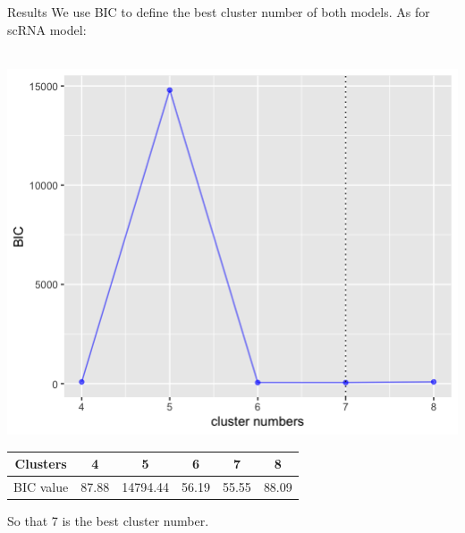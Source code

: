 \documentclass[10 pt]{beamer}
\begin{document}
\begin{frame}{Results}
We use BIC to define the best cluster number of both models.
As for scRNA model:
~\\
~\\
\centerline{\includegraphics[scale=0.3]{pic/BIC_sc.png}}

\begin{table}
	\begin{tabular}{c|c|c|c|c|c}
		\hline
		Clusters & 4 & 5& 6& 7 & 8  \\
		\hline
		BIC value & 87.88 & 14794.44 & 56.19 & 55.55& 88.09 \\
		\hline
		
	\end{tabular}
\end{table}
So that 7 is the best cluster number.
\end{frame}
\end{document}
